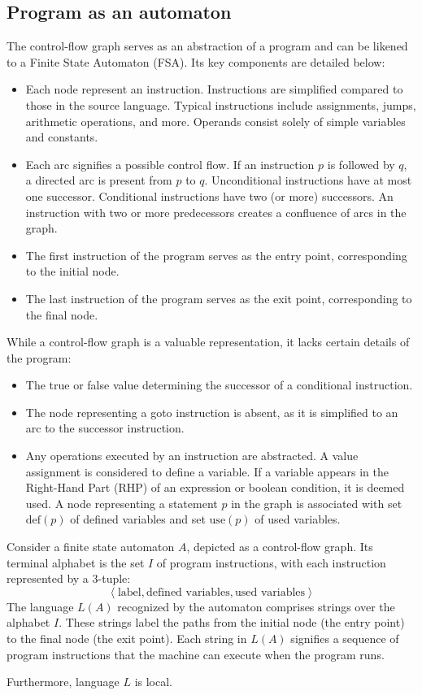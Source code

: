 \subsection{Program as an automaton}
The control-flow graph serves as an abstraction of a program and can be likened to a Finite State Automaton (FSA). Its key components are detailed below:
\begin{itemize}
    \item Each node represent an instruction. 
        Instructions are simplified compared to those in the source language.
        Typical instructions include assignments, jumps, arithmetic operations, and more.
        Operands consist solely of simple variables and constants.
    \item Each arc signifies a possible control flow. 
        If an instruction $p$ is followed by $q$, a directed arc is present from $p$ to $q$.
        Unconditional instructions have at most one successor.
        Conditional instructions have two (or more) successors.
        An instruction with two or more predecessors creates a confluence of arcs in the graph.
    \item The first instruction of the program serves as the entry point, corresponding to the initial node.
    \item The last instruction of the program serves as the exit point, corresponding to the final node.
\end{itemize}
While a control-flow graph is a valuable representation, it lacks certain details of the program:
\begin{itemize}
  \item The true or false value determining the successor of a conditional instruction.
  \item The node representing a goto instruction is absent, as it is simplified to an arc to the successor instruction.
  \item Any operations executed by an instruction are abstracted. 
    A value assignment is considered to define a variable.
    If a variable appears in the Right-Hand Part (RHP) of an expression or boolean condition, it is deemed used.
    A node representing a statement $p$ in the graph is associated with set $\text{def}(p)$ of defined variables and set $\text{use}(p)$ of used variables. 
\end{itemize}
\begin{definition}
    Consider a finite state automaton $A$, depicted as a control-flow graph.
     Its terminal alphabet is the set $I$ of program instructions, with each instruction represented by a $3$-tuple:
    \[ \left\langle \text{label}, \text{defined variables}, \text{used variables} \right\rangle \]
    The language $L(A)$ recognized by the automaton comprises strings over the alphabet $I$. 
    These strings label the paths from the initial node (the entry point) to the final node (the exit point).
    Each string in $L(A)$ signifies a sequence of program instructions that the machine can execute when the program runs.
\end{definition}
Furthermore, language $L$ is local.

